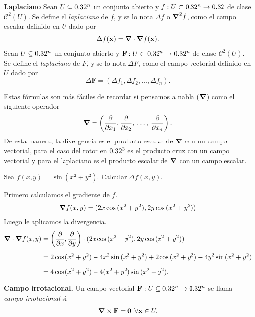 \begin{definition}\textbf{Laplaciano}
  Sean  $U  \subseteq  0.32^n$  un conjunto abierto y  $f:U\subset0.32^n\to0.32$  de clase $\mathcal{C}^2(U)$.   Se define el \emph{laplaciano} de $f$, y se lo nota $\Delta f$ o $\grad^2 f$,  como el campo escalar  definido en $U$  dado por
    \[
        \Delta f(\mathbf{x}) =\grad\cdot\grad f (\mathbf{x}).  
    \]
   Sean  $U  \subseteq  0.32^n$  un conjunto abierto y $\mathbf{F}:U\subset0.32^n\to0.32^n$ de clase $\mathcal{C}^2(U)$.   Se define el \emph{laplaciano} de $F$, y se lo nota $\Delta F$,  como el campo vectorial  definido en $U$  dado por
    \[
        \Delta\mathbf{F}=(\Delta f_1,\Delta f_2,\ldots,\Delta f_n). 
    \]
\end{definition}


\begin{obs}
    Estas f\'ormulas son m\'as f\'aciles de recordar si pensamos a nabla ($\grad$) como   el siguiente operador 
    \[
        \grad = \left(\frac{\partial}{\partial x_1},\frac{\partial}{\partial x_2},\:\ldots,\: \frac{\partial}{\partial x_n}\right).  
    \]
    De esta manera, la divergencia es el producto escalar de $\grad$ con un campo vectorial, para el caso del rotor en $0.32^3$ es el producto cruz  con un campo vectorial y para el laplaciano es el producto escalar de $\grad$ con un campo escalar.
\end{obs}

\begin{example}
    Sea $f(x,y)=\sin{(x^2+y^2)}$. Calcular $\Delta f(x,y)$.

    Primero calculamos el gradiente de $f$.
    \[
        \grad f(x,y) = (2x\cos{(x^2+y^2)}, 2y\cos{(x^2+y^2)})
    \]
    Luego le aplicamos la divergencia.
    \begin{align*}
        \grad\cdot\grad f (x,y) &= \left(\frac{\partial}{\partial x}, \frac{\partial}{\partial y}\right)\cdot (2x\cos{(x^2+y^2)}, 2y\cos{(x^2+y^2)})\\[.2cm]
        &= 2\cos{(x^2+y^2)}-4x^2\sin{(x^2+y^2)}+2\cos{(x^2+y^2)}-4y^2\sin{(x^2+y^2)}\\[.2cm]
        &=4\cos{(x^2+y^2)}-4(x^2+y^2)\sin{(x^2+y^2)}.
    \end{align*}
 \end{example}

\begin{definition}\textbf{Campo irrotacional.}
    Un campo vectorial $\mathbf{F}:U\subseteq0.32^n\to0.32^n$ se llama   \emph{campo irrotacional}  si $$\grad\times\mathbf{F}=\mathbf{0}  \:\: \forall  \mathbf{x} \in U.$$   
  \end{definition}  
  
